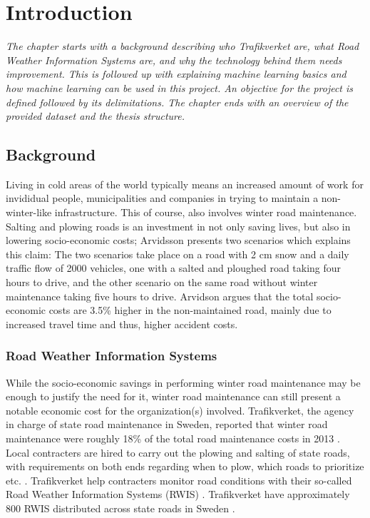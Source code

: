 \chapter{Introduction}
\emph{The chapter starts with a background describing who Trafikverket are, what Road Weather Information Systems are, and why the technology behind them needs improvement. This is followed up with explaining machine learning basics and how machine learning can be used in this project. An objective for the project is defined followed by its delimitations. The chapter ends with an overview of the provided dataset and the thesis structure. }

\section{Background} \label{sec:background}
	Living in cold areas of the world typically means an increased amount of work for invididual people, municipalities and companies in trying to maintain a non-winter-like infrastructure. This of course, also involves winter road maintenance. Salting and plowing roads is an investment in not only saving lives, but also in lowering socio-economic costs; Arvidsson \cite{ARTICLE:1} presents two scenarios which explains this claim: The two scenarios take place on a road with 2 cm snow and a daily traffic flow of 2000 vehicles, one with a salted and ploughed road taking four hours to drive, and the other scenario on the same road without winter maintenance taking five hours to drive. Arvidson argues that the total socio-economic costs are 3.5\% higher in the non-maintained road, mainly due to increased travel time and thus, higher accident costs. 


	\subsection{Road Weather Information Systems}
	While the socio-economic savings in performing winter road maintenance may be enough to justify the need for it, winter road maintenance can still present a notable economic cost for the organization(s) involved. Trafikverket, the agency in charge of state road maintenance in Sweden, reported that winter road maintenance were roughly 18\% of the total road maintenance costs in 2013 \cite{REPORT:1}. Local contracters are hired to carry out the plowing and salting of state roads, with requirements on both ends regarding when to plow, which roads to prioritize etc. \cite{WEBSITE:2}. Trafikverket help contracters monitor road conditions with their so-called Road Weather Information Systems (RWIS) \cite{WEBSITE:2}. Trafikverket have approximately 800 RWIS distributed across state roads in Sweden \cite{WEBSITE:2}. 

